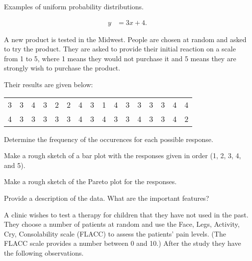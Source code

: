 

\begin{problem}
\item Examples of uniform probability distributions.

  \begin{subproblem}
  \item 
    \begin{eqnarray}
      y & = 3x + 4.
    \end{eqnarray}
    \vfill
  \end{subproblem}


\end{problem}




\begin{problem}

\item A new product is tested in the Midwest. People are chosen at
  random and asked to try the product. They are asked to provide their
  initial reaction on a scale from 1 to 5, where 1 means they would
  not purchase it and 5 means they are strongly wish to purchase the
  product.

  Their results are given below:\\
  \begin{tabular}{rrrrrrrrrrrrrrrr}
    3 & 3 & 4 & 3 & 2 & 2 & 4 & 3 &
    1 & 4 & 3 & 3 & 3 & 3 & 4 & 4 \\
    4 & 3 & 3 & 3 & 3 & 3 & 4 & 3 &
    4 & 3 & 3 & 4 & 3 & 3 & 4 & 2 \\
  \end{tabular}

  \begin{subproblem}
  \item Determine the frequency of the occurences for each possible
    response.
    \vfill
  \item Make a rough sketch of a bar plot with the responses given in
    order (1, 2, 3, 4, and 5).
    \vfill
    \clearpage
  \item Make a rough sketch of the Pareto plot for the responses.
    \vfill
  \item Provide a description of the data. What are the important features?
    \vspace{10em}
  \end{subproblem}

\clearpage

\item A clinic wishes to test a therapy for children that they have
  not used in the past. They choose a number of patients at random and
  use the Face, Legs, Activity, Cry, Consolability scale (FLACC) to
  assess the patients' pain levels. (The FLACC scale provides a number
  between 0 and 10.) After the study they have the following
  observations.


\end{problem}
